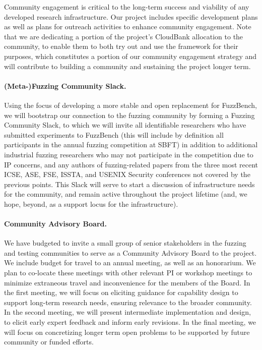 Community engagement is critical to the long-term success and viability of any
developed research infrastructure.  Our project includes specific development
plans as well as plans for outreach activities to enhance community engagement.  
Note that we are dedicating a portion of the project's CloudBank allocation to
the community, to enable them to both try out and use the framework for their
purposes, which constitutes a portion of our community engagement strategy and
will contribute to building a community and sustaining the project
longer term.

\paragraph{(Meta-)Fuzzing Community Slack.}  Using the focus of developing a more stable and
open replacement for FuzzBench, we will bootstrap our connection to
the fuzzing community by forming a Fuzzing Community Slack, to which
we will invite all identifiable researchers who have submitted
experiments to FuzzBench (this will include by definition all
participants in the annual fuzzing competition at SBFT) in addition to
additional industrial fuzzing researchers who may not participate in
the competition due to IP concerns, and any authors of fuzzing-related
papers from the three most recent ICSE, ASE, FSE, ISSTA, and USENIX
Security conferences not covered by the previous points.  This Slack
will serve to start a discussion of infrastructure needs for the
community, and remain active throughout the project lifetime (and, we
hope, beyond, as a support locus for the infrastructure).

\paragraph{Community Advisory Board.} We have budgeted to invite a small group
of senior stakeholders in the fuzzing and testing communities to serve as a
Community Advisory Board to the project.  We include budget for travel to an
annual meeting, as well as an honorarium. We plan to co-locate these meetings with
other relevant PI or workshop meetings to minimize extraneous travel and
inconvenience for the members of the Board.  In the first meeting, we will focus
on eliciting guidance for capability design to support long-term research needs,
ensuring relevance to the broader community.  In the second meeting, we will
present intermediate implementation and design, to elicit early expert feedback
and inform early revisions.  In the final meeting, we will focus on concretizing
longer term open problems to be supported by future community or
funded efforts.

